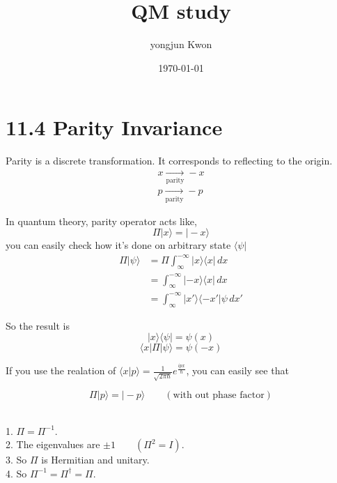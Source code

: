 \documentclass[a4paper,12pt]{article}
\title{QM study}
\author{yongjun Kwon}
\date{\today}
\begin{document}
\maketitle
\vspace{-2em} %

\setcounter{section}{1}

\section*{11.4 Parity Invariance}

Parity is a discrete transformation. It corresponds to reflecting to the origin.
\begin{align*}
  x  \underset{\text{parity}}{\longrightarrow} -x \\
  p \underset{\text{parity}}{\longrightarrow} -p
\end{align*}

In quantum theory, parity operator acts like,
\[
\Pi | x \rangle = | -x \rangle
\]
you can easily check how it's done on arbitrary state \(\langle \psi | \)
\begin{align*}
  \Pi | \psi \rangle  &=\Pi \int_{\infty}^{-\infty } | x \rangle\langle x | \,dx  \\
    &= \int_{\infty}^{-\infty} | -x \rangle\langle x |  \,dx \\
    &= \int_{\infty}^{-\infty} | x' \rangle\langle -x' | \psi \,dx'  
\end{align*}

So the result is
\[
| x \rangle\langle \psi | = \psi (x) 
\]
\[
\langle x | \Pi | \psi \rangle =\psi(-x)
\]

If you use the realation of \(\langle x | p \rangle  = \frac{1}{\sqrt{2 \pi \hbar}} e^{\frac{ipx}{\hbar}} \), you can easily see that

\[
\Pi | p \rangle =| -p \rangle \qquad (\text{with out phase factor})
\]

\begin{proposition} \hfill \\
  1. $\Pi = \Pi^{-1}$. \\
  2. The eigenvalues are $\pm 1 \qquad (\Pi^2= I)$.\\
  3. So $\Pi$ is Hermitian and unitary.\\
  4. So $\Pi^{-1}=\Pi^\dagger=\Pi$.
\end{proposition}
\end{document}

